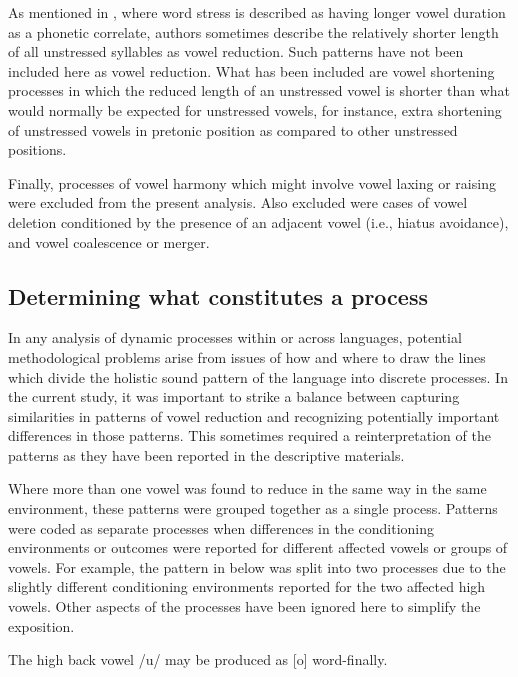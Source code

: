  As mentioned in , where word stress is described as having longer vowel duration as a phonetic correlate, authors sometimes describe the relatively shorter length of all unstressed syllables as vowel reduction. Such patterns have not been included here as vowel reduction. What has been included are vowel shortening processes in which the reduced length of an unstressed vowel is shorter than what would normally be expected for unstressed vowels, for instance, extra shortening of unstressed vowels in pretonic position as compared to other unstressed positions.

  Finally, processes of vowel harmony which might involve vowel laxing or raising were excluded from the present analysis. Also excluded were cases of vowel deletion conditioned by the presence of an adjacent vowel (i.e., hiatus avoidance), and vowel coalescence or merger.

\subsection{Determining what constitutes a process}\label{sec:6.2.2}

  In any analysis of dynamic processes within or across languages, potential methodological problems arise from issues of how and where to draw the lines which divide the holistic sound pattern of the language into discrete processes. In the current study, it was important to strike a balance between capturing similarities in patterns of vowel reduction and recognizing potentially important differences in those patterns. This sometimes required a reinterpretation of the patterns as they have been reported in the descriptive materials.

  Where more than one vowel was found to reduce in the same way in the same environment, these patterns were grouped together as a single process. Patterns were coded as separate processes when differences in the conditioning environments or outcomes were reported for different affected vowels or groups of vowels. For example, the pattern in  below was split into two processes due to the slightly different conditioning environments reported for the two affected high vowels. Other aspects of the processes have been ignored here to simplify the exposition.

\ea\label{ex:6.11}

\ea  The high back vowel /u/ may be produced as [o] word-finally.

